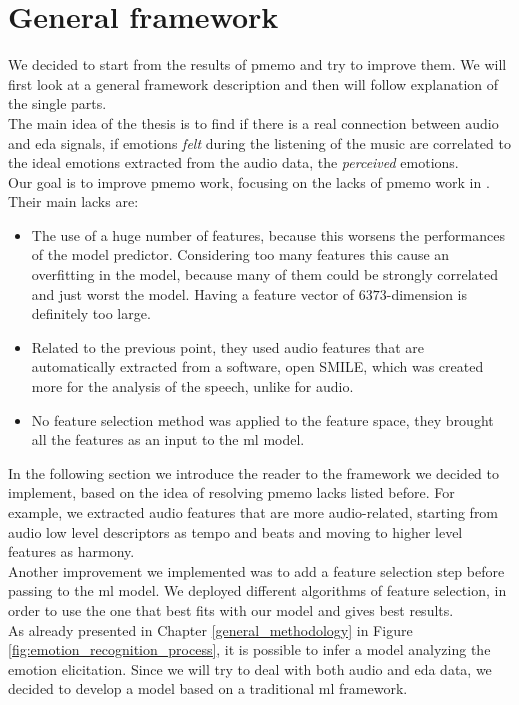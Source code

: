\section{General framework}
We decided to start from the results of \gls{pmemo} and try to improve them. We will first look at a general framework description and then will follow explanation of the single parts.
\\
The main idea of the thesis is to find if there is a real connection between audio and \gls{eda} signals, if emotions \textit{felt} during the listening of the music are correlated to the ideal emotions extracted from the audio data, the \textit{perceived} emotions.
\\
Our goal is to improve \gls{pmemo} work, focusing on the lacks of \gls{pmemo} work in \cite{zhang2018pmemo}. Their main lacks are:
\begin{itemize}
	\item The use of a huge number of features, because this worsens the performances of the model predictor. Considering too many features this cause an overfitting in the model, because many of them could be strongly correlated and just worst the model. Having a feature vector of $6373$-dimension is definitely too large.
	\item Related to the previous point, they used audio features that are automatically extracted from a software, open SMILE, which was created more for the analysis of the speech, unlike for audio.
	\item No feature selection method was applied to the feature space, they brought all the features as an input to the \gls{ml} model.
\end{itemize}
In the following section we introduce the reader to the framework we decided to implement, based on the idea of resolving \gls{pmemo} lacks listed before. For example, we extracted audio features that are more audio-related, starting from audio low level descriptors as tempo and beats and moving to higher level features as harmony.
\\ \indent
Another improvement we implemented was to add a feature selection step before passing to the \gls{ml} model. We deployed different algorithms of feature selection, in order to use the one that best fits with our model and gives best results.
\\ \indent
As already presented in Chapter \ref{general_methodology} in Figure \ref{fig:emotion_recognition_process}, it is possible to infer a model analyzing the emotion elicitation. Since we will try to deal with both audio and \gls{eda} data, we decided to develop a model based on a traditional \gls{ml} framework.
